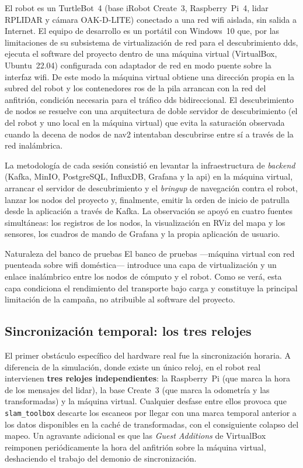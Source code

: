 El robot es un \mbox{TurtleBot~4} (base iRobot Create~3, Raspberry~Pi~4, \gls{lidar} RPLIDAR
y cámara OAK-D-LITE) conectado a una red wifi aislada, sin salida a Internet. El equipo de
desarrollo es un portátil con Windows~10 que, por las limitaciones de su subsistema de
virtualización de red para el descubrimiento \gls{dds}, ejecuta el software del proyecto
dentro de una máquina virtual (VirtualBox, Ubuntu~22.04) configurada con adaptador de red en
modo puente sobre la interfaz wifi. De este modo la máquina virtual obtiene una dirección
propia en la subred del robot y los contenedores \gls{ros} de la pila arrancan con la red del
anfitrión, condición necesaria para el tráfico \gls{dds} bidireccional. El descubrimiento de
nodos se resuelve con una arquitectura de doble servidor de descubrimiento (el del robot y
uno local en la máquina virtual) que evita la saturación observada cuando la decena de nodos
de \gls{nav2} intentaban descubrirse entre sí a través de la red inalámbrica.

La metodología de cada sesión consistió en levantar la infraestructura de \emph{backend}
(Kafka, MinIO, PostgreSQL, InfluxDB, Grafana y la \gls{api}) en la máquina virtual, arrancar
el servidor de descubrimiento y el \emph{bringup} de navegación contra el robot, lanzar los
nodos del proyecto y, finalmente, emitir la orden de inicio de patrulla desde la aplicación a
través de Kafka. La observación se apoyó en cuatro fuentes simultáneas: los registros de los
nodos, la visualización en RViz del mapa y los sensores, los cuadros de mando de Grafana y la
propia aplicación de usuario.

\begin{notebox}{Naturaleza del banco de pruebas}
  El banco de pruebas —máquina virtual con red puenteada sobre wifi doméstica— introduce una
  capa de virtualización y un enlace inalámbrico entre los nodos de cómputo y el robot. Como
  se verá, esta capa condiciona el rendimiento del transporte bajo carga y constituye la
  principal limitación de la campaña, no atribuible al software del proyecto.
\end{notebox}

\subsection{Sincronización temporal: los tres relojes}
\label{sec:real-relojes}

El primer obstáculo específico del hardware real fue la sincronización horaria. A diferencia
de la simulación, donde existe un único reloj, en el robot real intervienen \textbf{tres
relojes independientes}: la Raspberry~Pi (que marca la hora de los mensajes del \gls{lidar}),
la base Create~3 (que marca la odometría y las transformadas) y la máquina virtual. Cualquier
desfase entre ellos provoca que \texttt{slam\_toolbox} descarte los escaneos por llegar con
una marca temporal anterior a los datos disponibles en la caché de transformadas, con el
consiguiente colapso del mapeo. Un agravante adicional es que las \emph{Guest Additions} de
VirtualBox reimponen periódicamente la hora del anfitrión sobre la máquina virtual, deshaciendo
el trabajo del demonio de sincronización.

